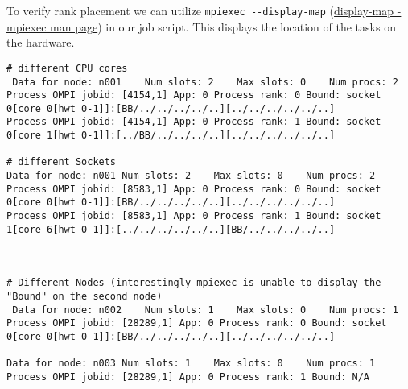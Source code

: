 \documentclass[UTF-8]{article}
\begin{document}
To verify rank placement we can utilize \verb|mpiexec --display-map| (\href{https://www.open-mpi.org/doc/v3.0/man1/mpiexec.1.php#:~:text=%2Ddisplay%2Dmap%2C%20%2D%2Ddisplay%2Dmap}{display-map - mpiexec man page}) in our job script. This displays the location of the tasks on the hardware.
\begin{lstlisting}
# different CPU cores
 Data for node: n001	Num slots: 2	Max slots: 0	Num procs: 2
Process OMPI jobid: [4154,1] App: 0 Process rank: 0 Bound: socket 0[core 0[hwt 0-1]]:[BB/../../../../..][../../../../../..]
Process OMPI jobid: [4154,1] App: 0 Process rank: 1 Bound: socket 0[core 1[hwt 0-1]]:[../BB/../../../..][../../../../../..]

# different Sockets
Data for node: n001	Num slots: 2	Max slots: 0	Num procs: 2
Process OMPI jobid: [8583,1] App: 0 Process rank: 0 Bound: socket 0[core 0[hwt 0-1]]:[BB/../../../../..][../../../../../..]
Process OMPI jobid: [8583,1] App: 0 Process rank: 1 Bound: socket 1[core 6[hwt 0-1]]:[../../../../../..][BB/../../../../..]



# Different Nodes (interestingly mpiexec is unable to display the "Bound" on the second node)
 Data for node: n002	Num slots: 1	Max slots: 0	Num procs: 1
Process OMPI jobid: [28289,1] App: 0 Process rank: 0 Bound: socket 0[core 0[hwt 0-1]]:[BB/../../../../..][../../../../../..]

Data for node: n003	Num slots: 1	Max slots: 0	Num procs: 1
Process OMPI jobid: [28289,1] App: 0 Process rank: 1 Bound: N/A
\end{lstlisting}
\end{document}
